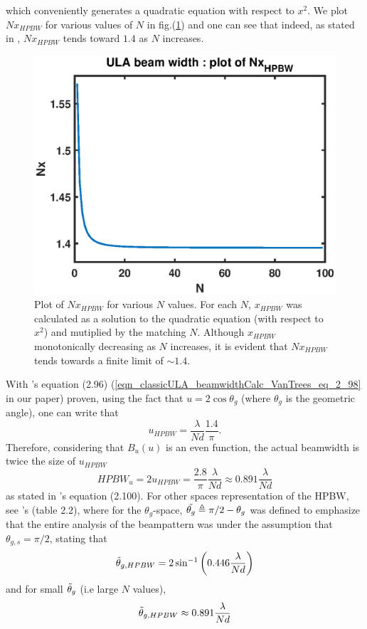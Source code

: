 which conveniently generates a quadratic equation with respect to $x^{2}$. We plot $Nx_{HPBW}$ for various values of $N$ in fig.(\ref{fig_classicULA_beamwidth_Nx_HPBW}) and one can see that indeed, as stated in \cite{VanTrees2002DetectionIV}, $Nx_{HPBW}$ tends toward $1.4$ as $N$ increases.
\begin{figure}
    \label{fig_classicULA_beamwidth_Nx_HPBW}
    \centering
    \includegraphics[width=0.6\linewidth]{./Media/spatial_IIR_MATLAB/beamwidth/Nx_HPBW.eps}
    \caption{Plot of $Nx_{HPBW}$ for various $N$ values. For each $N$, $x_{HPBW}$ was calculated as a solution to the quadratic equation (with respect to $x^{2}$) and mutiplied by the matching $N$. Although $x_{HPBW}$ monotonically decreasing as $N$ increases, it is evident that $Nx_{HPBW}$ tends towards a finite limit of $\sim1.4$.}
\end{figure}
With \cite{VanTrees2002DetectionIV}'s equation (2.96) (\ref{eqn_classicULA_beamwidthCalc_VanTrees_eq_2_98} in our paper) proven, using the fact that $u = 2\cos{\theta_{g}}$ (where $\theta_{g}$ is the geometric angle), one can write that
$$
u_{HPBW} = \frac{\lambda}{Nd}\frac{1.4}{\pi}.
$$
Therefore, considering that $B_{u}\left(u\right)$ is an even function, the actual beamwidth is twice the size of $u_{HPBW}$ 
\begin{equation}
    HPBW_{u} = 2u_{HPBW} = \frac{2.8}{\pi}\frac{\lambda}{Nd} \approx 0.891\frac{\lambda}{Nd}
\end{equation}
as stated in \cite{VanTrees2002DetectionIV}'s equation (2.100). For other spaces representation of the HPBW, see \cite{VanTrees2002DetectionIV}'s (table 2.2), where for the $\theta_{g}$-space, $\Tilde{\theta_{g}} \triangleq \pi/2-\theta_{g}$ was defined to emphasize that the entire analysis of the beampattern was under the assumption that $\theta_{g,s}=\pi/2$, stating that
\begin{equation}
    \Tilde{\theta}_{g,HPBW} = 2\sin^{-1}\left(0.446\frac{\lambda}{Nd}\right)
\end{equation}
and for small $\Tilde{\theta}_{g}$ (i.e large $N$ values),
\begin{equation}
    \Tilde{\theta}_{g,HPBW} \approx 0.891\frac{\lambda}{Nd}
\end{equation}